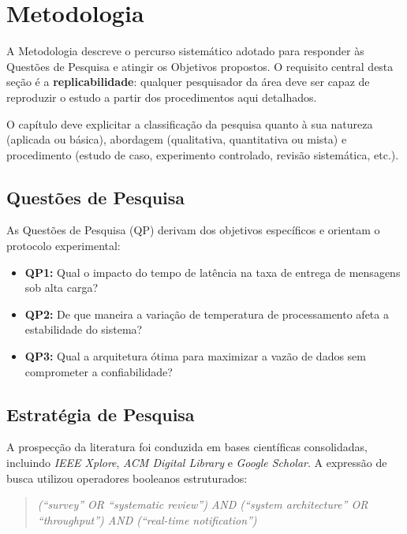 \chapter{Metodologia}
\label{chap:metodologia}

A Metodologia descreve o percurso sistemático adotado para responder às Questões de Pesquisa e atingir os Objetivos propostos. O requisito central desta seção é a \textbf{replicabilidade}: qualquer pesquisador da área deve ser capaz de reproduzir o estudo a partir dos procedimentos aqui detalhados.

O capítulo deve explicitar a classificação da pesquisa quanto à sua natureza (aplicada ou básica), abordagem (qualitativa, quantitativa ou mista) e procedimento (estudo de caso, experimento controlado, revisão sistemática, etc.).

\section{Questões de Pesquisa}
\label{sub:questoes_pesquisa}

As Questões de Pesquisa (QP) derivam dos objetivos específicos e orientam o protocolo experimental:

\begin{itemize}
    \item \textbf{QP1:} Qual o impacto do tempo de latência na taxa de entrega de mensagens sob alta carga?
    \item \textbf{QP2:} De que maneira a variação de temperatura de processamento afeta a estabilidade do sistema?
    \item \textbf{QP3:} Qual a arquitetura ótima para maximizar a vazão de dados sem comprometer a confiabilidade?
\end{itemize}

\section{Estratégia de Pesquisa}
\label{sub:estrategia_pesquisa}

A prospecção da literatura foi conduzida em bases científicas consolidadas, incluindo \textit{\gls{IEEE} Xplore}, \textit{\gls{ACM} Digital Library} e \textit{Google Scholar}. A expressão de busca utilizou operadores booleanos estruturados:

\begin{quote}
\textit{(\enquote{survey} OR \enquote{systematic review}) AND (\enquote{system architecture} OR \enquote{throughput}) AND (\enquote{real-time notification})}
\end{quote}

